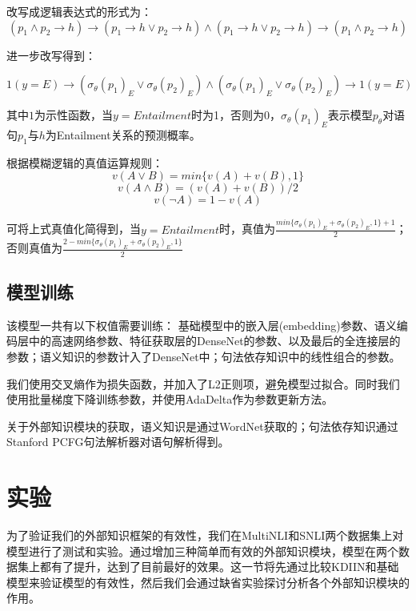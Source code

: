 \documentclass[UTF8,11pt,a4paper,nofonts]{ctexart}
\begin{document}
改写成逻辑表达式的形式为：
\begin{equation}
 (p_1 \land p_2 \to h) \to (p_1 \to h \vee p_2 \to h) \land (p_1 \to h \vee p_2 \to h) \to (p_1 \land p_2 \to h)
\end{equation}

进一步改写得到：

\begin{equation}
1(y=E) \to (\sigma_\theta(p_1)_E \vee \sigma_\theta(p_2)_E) \land (\sigma_\theta(p_1)_E \vee \sigma_\theta(p_2)_E) \to 1(y=E)
\end{equation}

其中$1$为示性函数，当$y=Entailment$时为1，否则为0，$\sigma_\theta(p_1)_E$表示模型$p_\theta$对语句$p_1$与$h$为Entailment关系的预测概率。

根据模糊逻辑的真值运算规则：
\begin{equation}
v(A \vee B) = min\{v(A)+v(B),1\}
\end{equation}
\begin{equation}
v(A \land B) = (v(A) + v(B)) / 2
\end{equation}
\begin{equation}
v(\neg A) = 1 - v(A)
\end{equation}

可将上式真值化简得到，当$y=Entailment$时，真值为$\frac{min\{\sigma_\theta(p_1)_E+\sigma_\theta(p_2)_E,1\}+1}{2}$；否则真值为$\frac{2-min\{\sigma_\theta(p_1)_E+\sigma_\theta(p_2)_E,1\}}{2}$

\subsection{模型训练}


该模型一共有以下权值需要训练：
基础模型中的嵌入层(embedding)参数、语义编码层中的高速网络参数、特征获取层的DenseNet的参数、以及最后的全连接层的参数；语义知识的参数计入了DenseNet中；句法依存知识中的线性组合的参数。

我们使用交叉熵作为损失函数，并加入了L2正则项，避免模型过拟合。同时我们使用批量梯度下降训练参数，并使用AdaDelta\cite{Zeiler2012ADADELTAAA}作为参数更新方法。

关于外部知识模块的获取，语义知识是通过WordNet获取的；句法依存知识通过Stanford PCFG句法解析器对语句解析得到。



\section{实验}
为了验证我们的外部知识框架的有效性，我们在MultiNLI和SNLI两个数据集上对模型进行了测试和实验。通过增加三种简单而有效的外部知识模块，模型在两个数据集上都有了提升，达到了目前最好的效果。这一节将先通过比较KDIIN和基础模型来验证模型的有效性，然后我们会通过缺省实验探讨分析各个外部知识模块的作用。
\end{document}
